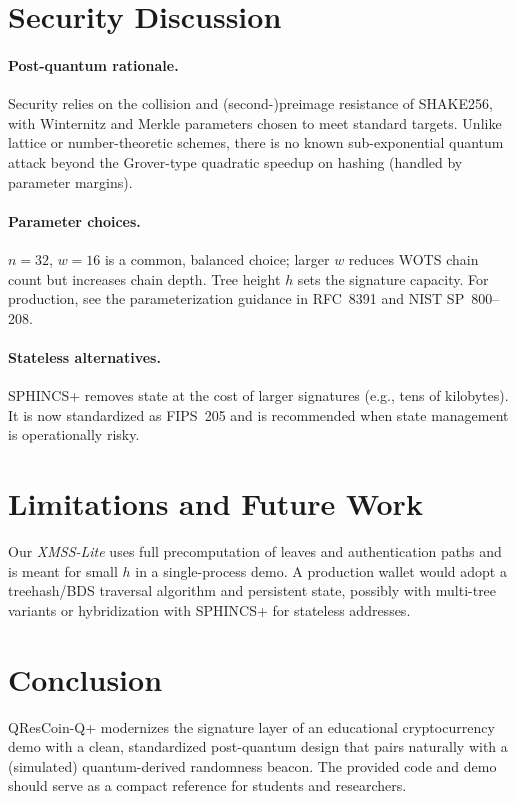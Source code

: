 \documentclass[11pt]{article}
\begin{document}
\section{Security Discussion}
\paragraph{Post-quantum rationale.} Security relies on the collision and (second-)preimage resistance of SHAKE256, with Winternitz and Merkle parameters chosen to meet standard targets. Unlike lattice or number-theoretic schemes, there is no known sub-exponential quantum attack beyond the Grover-type quadratic speedup on hashing (handled by parameter margins).

\paragraph{Parameter choices.} $n{=}32$, $w{=}16$ is a common, balanced choice; larger $w$ reduces WOTS chain count but increases chain depth. Tree height $h$ sets the signature capacity. For production, see the parameterization guidance in RFC~8391 and NIST SP~800--208.

\paragraph{Stateless alternatives.} SPHINCS+ removes state at the cost of larger signatures (e.g., tens of kilobytes). It is now standardized as FIPS~205 and is recommended when state management is operationally risky.

\section{Limitations and Future Work}
Our \emph{XMSS-Lite} uses full precomputation of leaves and authentication paths and is meant for small $h$ in a single-process demo. A production wallet would adopt a treehash/BDS traversal algorithm and persistent state, possibly with multi-tree variants or hybridization with SPHINCS+ for stateless addresses.

\section{Conclusion}
QResCoin-Q+ modernizes the signature layer of an educational cryptocurrency demo with a clean, standardized post-quantum design that pairs naturally with a (simulated) quantum-derived randomness beacon. The provided code and demo should serve as a compact reference for students and researchers.
\end{document}
